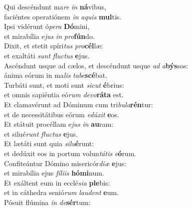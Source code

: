 \oddverse Qui descéndunt ma\textit{re} \textit{in} \textbf{ná}vibus,~\*\\
\oddverse faciéntes operatiónem \textit{in} \textit{a}\textit{quis} \textbf{mul}tis.\\
\evenverse Ipsi vidérunt ó\textit{pe}\textit{ra} \textbf{Dó}mini,~\*\\
\evenverse et mirabília e\textit{jus} \textit{in} \textit{pro}\textbf{fún}do.\\
\oddverse Dixit, et stetit spíri\textit{tus} \textit{pro}\textbf{cél}læ:~\*\\
\oddverse et exaltáti \textit{sunt} \textit{flu}\textit{ctus} \textbf{e}jus.\\
\evenverse Ascéndunt usque ad cælos, et descéndunt usque \textit{ad} \textit{a}\textbf{býs}sos:~\*\\
\evenverse ánima eórum in ma\textit{lis} \textit{ta}\textit{be}\textbf{scé}bat.\\
\oddverse Turbáti sunt, et moti sunt \textit{si}\textit{cut} \textbf{é}brius:~\*\\
\oddverse et omnis sapiéntia eó\textit{rum} \textit{de}\textit{vo}\textbf{rá}\textbf{ta} est.\\
\evenverse Et clamavérunt ad Dóminum cum tri\textit{bu}\textit{la}\textbf{rén}tur:~\*\\
\evenverse et de necessitátibus eórum \textit{e}\textit{dú}\textit{xit} \textbf{e}os.\\
\oddverse Et státuit procéllam e\textit{jus} \textit{in} \textbf{au}ram:~\*\\
\oddverse et silué\textit{runt} \textit{flu}\textit{ctus} \textbf{e}jus.\\
\evenverse Et lætáti sunt quia \textit{si}\textit{lu}\textbf{é}runt:~\*\\
\evenverse et dedúxit eos in portum volun\textit{tá}\textit{tis} \textit{e}\textbf{ó}rum.\\
\oddverse Confiteántur Dómino misericór\textit{di}\textit{æ} \textbf{e}jus:~\*\\
\oddverse et mirabília ejus \textit{fí}\textit{li}\textit{is} \textbf{hó}\textbf{mi}num.\\
\evenverse Et exáltent eum in ecclé\textit{si}\textit{a} \textbf{ple}bis:~\*\\
\evenverse et in cáthedra senió\textit{rum} \textit{lau}\textit{dent} \textbf{e}um.\\
\oddverse Pósuit flúmina \textit{in} \textit{de}\textbf{sér}tum:~\*\\
